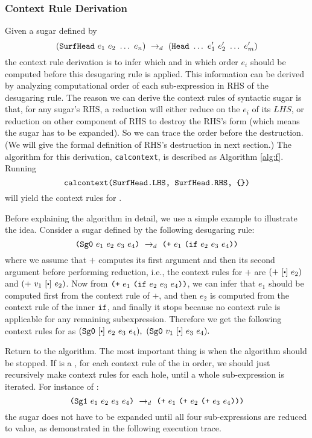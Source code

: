 \subsubsection{Context Rule Derivation}
Given a sugar  defined by
\[
(\mbox{\tt SurfHead}~e_1~e_2~\ldots~e_n) ~\rightarrow_d~ (\mbox{\tt Head}~\ldots~e_1'~e_2'~\ldots~e_m')
\]
the context rule derivation is to infer which and in which order $e_i$ should be computed before this desugaring rule is applied. This information can be derived by analyzing computational order of each sub-expression in RHS of the desugaring rule. The reason we can derive the context rules of syntactic sugar is that, for any sugar's RHS, a reduction will either reduce on the $e_i$ of its $LHS$, or reduction on other component of RHS to destroy the RHS's form (which means the sugar has to be expanded). So we can trace the order before the destruction. (We will give the formal definition of RHS's destruction in next section.) The algorithm for this derivation, \texttt{calcontext}, is described as Algorithm \ref{alg:f}. Running
\[
 \texttt{calcontext(\mbox{\tt SurfHead}.LHS,~\mbox{\tt SurfHead}.RHS, \{\})}
\]
will yield the context rules for .

Before explaining the algorithm in detail, we use a simple example to illustrate the idea.
Consider a sugar  defined by the following desugaring rule:
\[
\mbox{\tt (Sg0}~e_1~e_2~e_3~e_4\mbox{\tt )} ~\rightarrow_d~ \mbox{\tt (+}~e_1~\mbox{\tt (if}~e_2~e_3~e_4\mbox{\tt ))}
\]
where we assume that $+$ computes its first argument and then its second argument before performing reduction, i.e., the context rules for $+$ are  $(+~[\bigcdot]~e_2)$ and $(+~v_1~[\bigcdot]~e_2)$. Now from $\mbox{\tt (+}~e_1~\mbox{\tt (if}~e_2~e_3~e_4\mbox{\tt ))}$, we can infer that $e_1$ should be computed first from the context rule of $+$, and then $e_2$ is computed from the context rule of the inner $\mbox{\tt if}$, and finally it stops because no context rule is applicable for any remaining subexpression. Therefore we get the following context rules for  as
$
(\m{Sg0}~[\bigcdot]~e_2~e_3~e_4),~(\m{Sg0}~v_1~[\bigcdot]~e_3~e_4).
$

Return to the algorithm. The most important thing is when the algorithm should be stopped. If  is a , for each context rule of the  in order, we should just recursively make context rules for each hole, until a whole sub-expression is iterated. For instance of :
\[
\mbox{\tt (Sg1}~e_1~e_2~e_3~e_4\mbox{\tt )} ~\rightarrow_d~ \mbox{\tt (+}~e_1~\mbox{\tt (+}~e_2~\mbox{\tt (+}~e_3~e_4\mbox{\tt )))}
\]
the sugar does not have to be expanded until all four sub-expressions are reduced to value, as demonstrated in the following execution trace.

